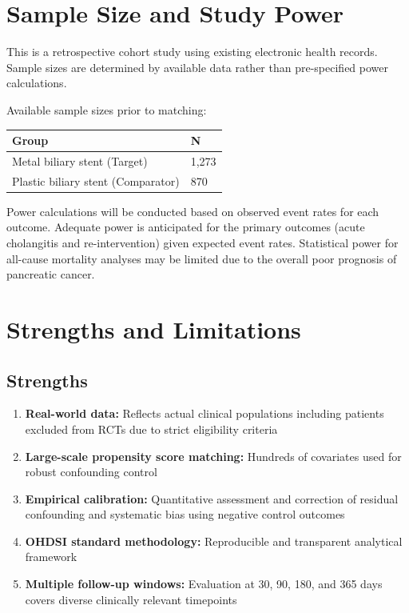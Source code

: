 \documentclass[
  12pt,
]{article}
\providecommand{\tightlist}{%
  \setlength{\itemsep}{0pt}\setlength{\parskip}{0pt}}
\begin{document}
\section{Sample Size and Study Power}\label{sample-size}

This is a retrospective cohort study using existing electronic health records. Sample sizes are determined by available data rather than pre-specified power calculations.

Available sample sizes prior to matching:

\begin{longtable}[]{@{}ll@{}}
\toprule\noalign{}
Group & N \\
\midrule\noalign{}
\endhead
\bottomrule\noalign{}
\endlastfoot
Metal biliary stent (Target) & 1,273 \\
Plastic biliary stent (Comparator) & 870 \\
\end{longtable}

Power calculations will be conducted based on observed event rates for each outcome. Adequate power is anticipated for the primary outcomes (acute cholangitis and re-intervention) given expected event rates. Statistical power for all-cause mortality analyses may be limited due to the overall poor prognosis of pancreatic cancer.

\section{Strengths and Limitations}\label{strengths-limitations}

\subsection{Strengths}\label{strengths}

\begin{enumerate}
\def\labelenumi{\arabic{enumi}.}
\tightlist
\item
  \textbf{Real-world data:} Reflects actual clinical populations including patients excluded from RCTs due to strict eligibility criteria
\item
  \textbf{Large-scale propensity score matching:} Hundreds of covariates used for robust confounding control
\item
  \textbf{Empirical calibration:} Quantitative assessment and correction of residual confounding and systematic bias using negative control outcomes
\item
  \textbf{OHDSI standard methodology:} Reproducible and transparent analytical framework
\item
  \textbf{Multiple follow-up windows:} Evaluation at 30, 90, 180, and 365 days covers diverse clinically relevant timepoints
\end{enumerate}
\end{document}
